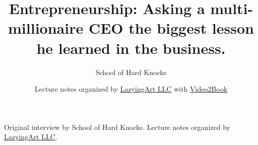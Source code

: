 \documentclass[11pt,oneside]{book}
\begin{document}
\frontmatter
\title{Entrepreneurship: Asking a multi-millionaire CEO the biggest lesson he learned in the business.}
\author{School of Hard Knocks}
\date{Lecture notes organized by \href{https://lazying.art}{LazyingArt LLC} with \href{https://github.com/lachlanchen/Video2Book}{Video2Book}}
\maketitle
\begin{center}
\small Original interview by School of Hard Knocks. Lecture notes organized by \href{https://lazying.art}{LazyingArt LLC}.
\end{center}
\clearpage
\mainmatter

\end{document}
